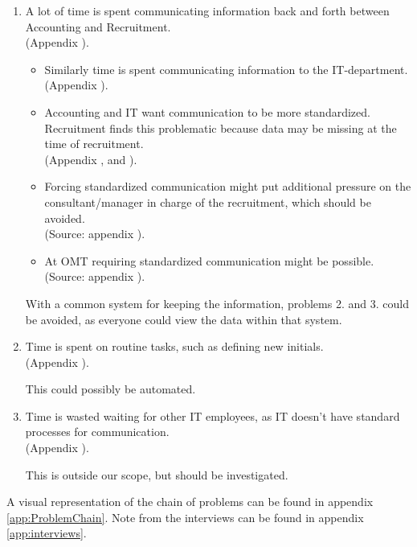 \begin{enumerate}
\item A lot of time is spent communicating information back and forth between Accounting and Recruitment. \\
(Appendix ).
\begin{itemize}
\item Similarly time is spent communicating information to the IT-department.\\
(Appendix ).
\item Accounting and IT want communication to be more standardized. Recruitment finds this problematic because data may be missing at the time of recruitment.\\
(Appendix ,  and ).
\item Forcing standardized communication might put additional pressure on the consultant/manager in charge of the recruitment, which should be avoided.\\
(Source: appendix ).
\item At OMT requiring standardized communication might be possible.\\
(Source: appendix ).
\end{itemize}

With a common system for keeping the information, problems 2. and 3. could be avoided, as everyone could view the data within that system.

\item Time is spent on routine tasks, such as defining new initials.\\
(Appendix ).

This could possibly be automated.

\item Time is wasted waiting for other IT employees, as IT doesn't have standard processes for communication.\\
(Appendix ).

This is outside our scope, but should be investigated.
\end{enumerate}

A visual representation of the chain of problems can be found in appendix \ref{app:ProblemChain}.
Note from the interviews can be found in appendix \ref{app:interviews}.

